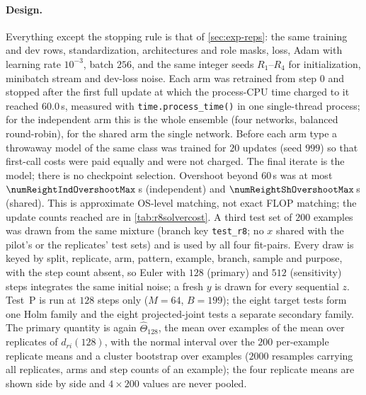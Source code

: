 \documentclass{article}
\theoremstyle{plain}
\theoremstyle{definition}
\theoremstyle{remark}
\begin{document}
\paragraph{Design.}
Everything except the stopping rule is that of \cref{sec:exp-reps}: the same training and dev rows, standardization, architectures and role masks, loss, Adam with learning rate $10^{-3}$, batch $256$, and the same integer seeds $R_1$--$R_4$ for initialization, minibatch stream and dev-loss noise. Each arm was retrained from step $0$ and stopped after the first full update at which the process-CPU time charged to it reached $60.0$\,s, measured with \texttt{time.process\_time()} in one single-thread process; for the independent arm this is the whole ensemble (four networks, balanced round-robin), for the shared arm the single network. Before each arm type a throwaway model of the same class was trained for $20$ updates (seed $999$) so that first-call costs were paid equally and were not charged. The final iterate is the model; there is no checkpoint selection. Overshoot beyond $60$\,s was at most $\numReightIndOvershootMax$\,s (independent) and $\numReightShOvershootMax$\,s (shared). This is approximate OS-level matching, not exact FLOP matching; the update counts reached are in \cref{tab:r8solvercost}.
A third test set of $200$ examples was drawn from the same mixture (branch key \texttt{test\_r8}; no $x$ shared with the pilot's or the replicates' test sets) and is used by all four fit-pairs. Every draw is keyed by split, replicate, arm, pattern, example, branch, sample and purpose, with the step count absent, so Euler with $128$ (primary) and $512$ (sensitivity) steps integrates the same initial noise; a fresh $y$ is drawn for every sequential $z$. Test~P is run at $128$ steps only ($M=64$, $B=199$); the eight target tests form one Holm family and the eight projected-joint tests a separate secondary family. The primary quantity is again $\widehat\Theta_{128}$, the mean over examples of the mean over replicates of $d_{ri}(128)$, with the normal interval over the $200$ per-example replicate means and a cluster bootstrap over examples ($2000$ resamples carrying all replicates, arms and step counts of an example); the four replicate means are shown side by side and $4\times200$ values are never pooled.
\end{document}
